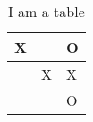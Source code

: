\begin{table}[h]
\centering
\begin{tabular}{|l|l|l|}
\hline
X &   & O \\ \hline
  & X & X \\ \hline
  &   & O \\ \hline
\end{tabular}
\caption{I am a table}
\label{tab:my-table}
\end{table}